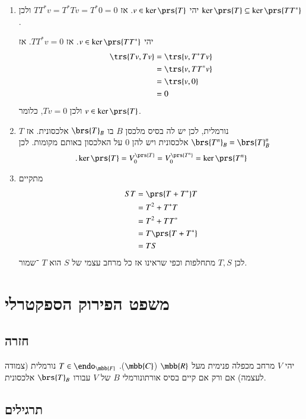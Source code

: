 \documentclass[a4paper,10pt,oneside,openany]{article}
\begin{document}
\begin{solution}
\begin{enumerate}
\item יהי
$v \in \ker \prs{T}$.
אז
$T T^* v = T^* T v = T^* 0 = 0$
ולכן
$\ker\prs{T} \subseteq \ker\prs{T T^*}$.

יהי
$v \in \ker\prs{TT^*}$.
אז
$TT^* v = 0$.
אז
\begin{align*}
\trs{Tv, Tv} &= \trs{v, T^* T v}
\\&= \trs{v, T T^* v}
\\&= \trs{v,0}
\\&= 0
\end{align*}
ולכן
$Tv = 0$,
כלומר
$v \in \ker\prs{T}$.
\item
$T$
נורמלית, לכן יש לה בסיס מלכסן
$B$
בו
$\brs{T}_B$
אלכסונית.
אז
$\brs{T^n}_B = \brs{T}_B^n$
אלכסונית ויש להן
$0$
על האלכסון באותם מקומות. לכן
\[\text{.} \ker \prs{T} = V_0^{\prs{T}} = V_0^{\prs{T^n}} = \ker\prs{T^n}\]

\item
מתקיים
\begin{align*}
ST &= \prs{T + T^*} T
\\&= T^2 + T^* T
\\&= T^2 + TT^*
\\&= T\prs{T + T^*}
\\&= TS
\end{align*}
לכן
$T,S$
מתחלפות וכפי שראינו אז כל מרחב עצמי של
$S$
הוא
$T$%
־שמור.
\end{enumerate}
\end{solution}

\section{משפט הפירוק הספקטרלי}

\subsection{חזרה}

\begin{theorem}
יהי
$V$
מרחב מכפלה פנימית מעל
$\mbb{R}$ ($\mbb{C}$).
$T \in \endo_{\mbb{F}}$
נורמלית (צמודה לעצמה) אם ורק אם קיים בסיס אורתונורמלי
$B$
של
$V$
עבורו
$\brs{T}_B$
אלכסונית.
\end{theorem}

\subsection{תרגילים}
\end{document}
